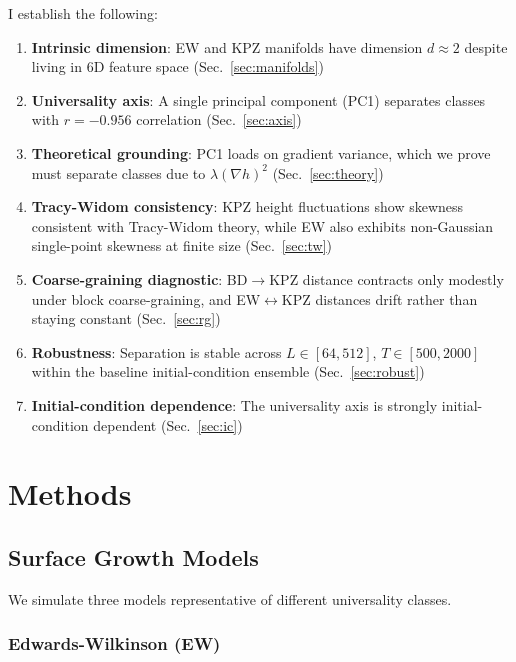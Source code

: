 \documentclass[aps,pre,twocolumn,superscriptaddress,showpacs]{revtex4-2}
\begin{document}
I establish the following:
\begin{enumerate}
\item \textbf{Intrinsic dimension}: EW and KPZ manifolds have dimension $d \approx 2$ despite living in 6D feature space (Sec.~\ref{sec:manifolds})
\item \textbf{Universality axis}: A single principal component (PC1) separates classes with $r = -0.956$ correlation (Sec.~\ref{sec:axis})
\item \textbf{Theoretical grounding}: PC1 loads on gradient variance, which we prove must separate classes due to $\lambda(\nabla h)^2$ (Sec.~\ref{sec:theory})
\item \textbf{Tracy-Widom consistency}: KPZ height fluctuations show skewness consistent with Tracy-Widom theory, while EW also exhibits non-Gaussian single-point skewness at finite size (Sec.~\ref{sec:tw})
\item \textbf{Coarse-graining diagnostic}: BD$\to$KPZ distance contracts only modestly under block coarse-graining, and EW$\leftrightarrow$KPZ distances drift rather than staying constant (Sec.~\ref{sec:rg})
\item \textbf{Robustness}: Separation is stable across $L \in [64, 512]$, $T \in [500, 2000]$ within the baseline initial-condition ensemble (Sec.~\ref{sec:robust})
\item \textbf{Initial-condition dependence}: The universality axis is strongly initial-condition dependent (Sec.~\ref{sec:ic})
\end{enumerate}

\section{Methods}
\label{sec:methods}

\subsection{Surface Growth Models}

We simulate three models representative of different universality classes.

\subsubsection{Edwards-Wilkinson (EW)}
\end{document}
